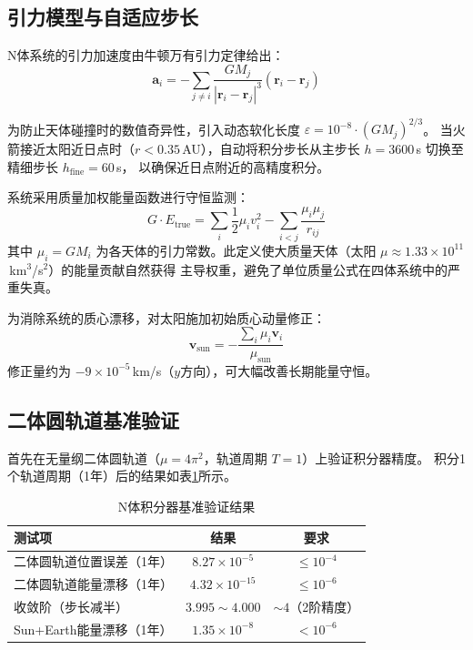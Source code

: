 \documentclass[UTF8,12pt,a4paper]{ctexart}
\begin{document}
\subsection{引力模型与自适应步长}

N体系统的引力加速度由牛顿万有引力定律给出：
\begin{equation}
    \mathbf{a}_i = -\sum_{j\neq i} \frac{GM_j}{|\mathbf{r}_i - \mathbf{r}_j|^3}
                   (\mathbf{r}_i - \mathbf{r}_j)
\end{equation}

为防止天体碰撞时的数值奇异性，引入动态软化长度
$\varepsilon = 10^{-8}\cdot (GM_j)^{2/3}$。
当火箭接近太阳近日点时（$r < 0.35$\,AU），自动将积分步长从主步长
$h = 3600$\,s 切换至精细步长 $h_{\text{fine}} = 60$\,s，
以确保近日点附近的高精度积分。

系统采用质量加权能量函数进行守恒监测：
\begin{equation}
    G\cdot E_{\text{true}} = \sum_i \frac{1}{2}\mu_i v_i^2
    - \sum_{i<j} \frac{\mu_i \mu_j}{r_{ij}}
\end{equation}
其中 $\mu_i = GM_i$ 为各天体的引力常数。此定义使大质量天体（太阳
$\mu \approx 1.33\times 10^{11}$\,km$^3$/s$^2$）的能量贡献自然获得
主导权重，避免了单位质量公式在四体系统中的严重失真。

为消除系统的质心漂移，对太阳施加初始质心动量修正：
\begin{equation}
    \mathbf{v}_{\text{sun}} = -\frac{\sum_i \mu_i \mathbf{v}_i}{\mu_{\text{sun}}}
\end{equation}
修正量约为 $-9\times 10^{-5}$\,km/s（$y$方向），可大幅改善长期能量守恒。

\subsection{二体圆轨道基准验证}

首先在无量纲二体圆轨道（$\mu = 4\pi^2$，轨道周期 $T=1$）上验证积分器精度。
积分1个轨道周期（1年）后的结果如表\ref{tab:nbody_benchmark}所示。

\begin{table}[htbp]
\centering
\caption{N体积分器基准验证结果}
\label{tab:nbody_benchmark}
\begin{tabular}{lcc}
\toprule
测试项 & 结果 & 要求 \\
\midrule
二体圆轨道位置误差（1年） & $8.27\times 10^{-5}$ & $\le 10^{-4}$ \\
二体圆轨道能量漂移（1年） & $4.32\times 10^{-15}$ & $\le 10^{-6}$ \\
收敛阶（步长减半） & $3.995\sim 4.000$ & $\sim 4$（2阶精度） \\
Sun+Earth能量漂移（1年） & $1.35\times 10^{-8}$ & $<10^{-6}$ \\
\bottomrule
\end{tabular}
\end{table}
\end{document}
